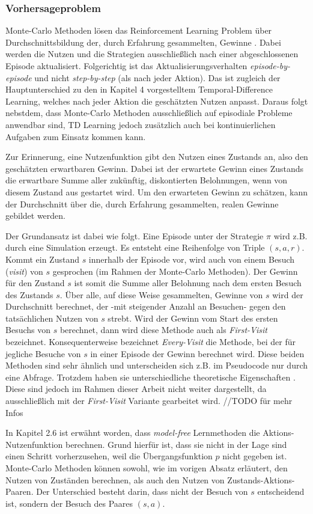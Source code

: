 \subsubsection{Vorhersageproblem}
Monte-Carlo Methoden lösen das Reinforcement Learning Problem über Durchschnittsbildung der, durch Erfahrung gesammelten, Gewinne \cite[S.~91]{Sutton1998}. Dabei werden die Nutzen und die Strategien ausschließlich nach einer abgeschlossenen Episode aktualisiert. Folgerichtig ist das Aktualisierungsverhalten \textit{episode-by-episode} und nicht \textit{step-by-step} (als nach jeder Aktion)\cite[S.~91]{Sutton1998}. Das ist zugleich der Hauptunterschied zu den in Kapitel 4 vorgestelltem Temporal-Difference Learning, welches nach jeder Aktion die geschätzten Nutzen anpasst. Daraus folgt nebstdem, dass Monte-Carlo Methoden ausschließlich auf episodiale Probleme anwendbar sind, TD Learning jedoch zusätzlich auch bei kontinuierlichen Aufgaben zum Einsatz kommen kann. 
\par
Zur Erinnerung, eine Nutzenfunktion gibt den Nutzen eines Zustands an, also den geschätzten erwartbaren Gewinn. Dabei ist der erwartete Gewinn eines Zustands die erwartbare Summe aller zukünftig, diskontierten Belohnungen, wenn von diesem Zustand aus gestartet wird. Um den erwarteten Gewinn zu schätzen, kann der Durchschnitt über die, durch Erfahrung gesammelten, realen Gewinne gebildet werden.
\par 
Der Grundansatz ist dabei wie folgt. Eine Episode unter der Strategie $\pi$ wird z.B. durch eine Simulation erzeugt. Es entsteht eine Reihenfolge von Triple $(s,a,r)$. Kommt ein Zustand $s$ innerhalb der Episode vor, wird auch von einem Besuch (\textit{visit}) von $s$ gesprochen (im Rahmen der Monte-Carlo Methoden). Der Gewinn für den Zustand $s$ ist somit die Summe aller Belohnung nach dem ersten Besuch des Zustands $s$. Über alle, auf diese Weise gesammelten, Gewinne von $s$ wird der Durchschnitt berechnet, der -mit steigender Anzahl an Besuchen- gegen den tatsächlichen Nutzen von $s$ strebt. Wird der Gewinn vom Start des ersten Besuchs von $s$ berechnet, dann wird diese Methode auch als \textit{First-Visit} bezeichnet. Konsequenterweise bezeichnet \textit{Every-Visit} die Methode, bei der für jegliche Besuche von $s$ in einer Episode der Gewinn berechnet wird. Diese beiden Methoden sind sehr ähnlich und unterscheiden sich z.B. im Pseudocode nur durch eine Abfrage. Trotzdem haben sie unterschiedliche theoretische Eigenschaften \cite[S.~92]{Sutton1998}. Diese sind jedoch im Rahmen dieser Arbeit nicht weiter dargestellt, da ausschließlich mit der \textit{First-Visit} Variante gearbeitet wird. //TODO für mehr Infos
\par 
In Kapitel 2.6 ist erwähnt worden, dass \textit{model-free} Lernmethoden die Aktions-Nutzenfunktion berechnen. Grund hierfür ist, dass sie nicht in der Lage sind einen Schritt vorherzusehen, weil die Übergangsfunktion $p$ nicht gegeben ist. Monte-Carlo Methoden können sowohl, wie im vorigen Absatz erläutert, den Nutzen von Zuständen berechnen, als auch den Nutzen von Zustands-Aktions-Paaren. Der Unterschied besteht darin, dass nicht der Besuch von $s$ entscheidend ist, sondern der Besuch des Paares $(s,a)$.

